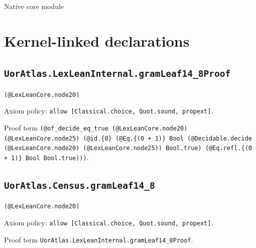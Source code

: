 \documentclass[11pt]{article}
\begin{document}
\begin{center}{\LARGE Native core module}\end{center}
\section*{Kernel-linked declarations}
\subsection*{\texttt{UorAtlas.LexLeanInternal.gramLeaf14\_8Proof}}
\noindent\texttt{(@LexLeanCore.node20)}\par
\noindent Axiom policy: \texttt{allow [Classical.choice, Quot.sound, propext]}.\par
\noindent Proof term \texttt{(@of\_decide\_eq\_true (@LexLeanCore.node20) (@LexLeanCore.node25) (@id.\{0\} (@Eq.\{(0 + 1)\} Bool (@Decidable.decide (@LexLeanCore.node20) (@LexLeanCore.node25)) Bool.true) (@Eq.refl.\{(0 + 1)\} Bool Bool.true)))}.\par
\subsection*{\texttt{UorAtlas.Census.gramLeaf14\_8}}
\noindent\texttt{(@LexLeanCore.node20)}\par
\noindent Axiom policy: \texttt{allow [Classical.choice, Quot.sound, propext]}.\par
\noindent Proof term \texttt{UorAtlas.LexLeanInternal.gramLeaf14\_8Proof}.\par
\end{document}
